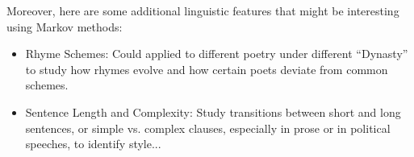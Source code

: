 \documentclass[12pt]{article}
\begin{document}
Moreover, here are some additional linguistic features that might be interesting using Markov methods:
\begin{itemize}
    \item Rhyme Schemes: Could applied to different poetry under different ``Dynasty'' to study how rhymes evolve and how certain poets deviate from common schemes.
    \item Sentence Length and Complexity: Study transitions between short and long sentences, or simple vs. complex clauses, especially in prose or in political speeches, to identify style...
\end{itemize}
\end{document}
